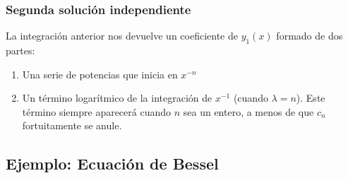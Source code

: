\documentclass[12pt]{beamer}
\begin{document}
\begin{frame}
\frametitle{Segunda solución independiente}
La integración anterior nos devuelve un coeficiente de $y_{1}(x)$ formado de dos partes:
\pause
{}
\begin{enumerate}[<+->]
\item Una serie de potencias que inicia en $x^{-n}$
\item Un término logarítmico de la integración de $x^{-1}$ (cuando $\lambda = n$). Este término siempre aparecerá cuando $n$ sea un entero, a menos de que $c_{n}$ fortuitamente se anule.
\end{enumerate}
\end{frame}

\subsection{Ejemplo: Ecuación de Bessel}
\end{document}
